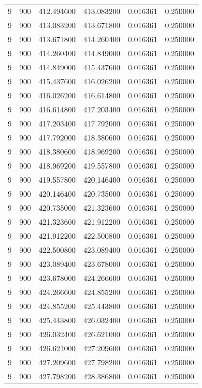 \begin{longtable}{rrrrrr}
9 & 900 & 412.494600 & 413.083200 & 0.016361 & 0.250000 \\
9 & 900 & 413.083200 & 413.671800 & 0.016361 & 0.250000 \\
9 & 900 & 413.671800 & 414.260400 & 0.016361 & 0.250000 \\
9 & 900 & 414.260400 & 414.849000 & 0.016361 & 0.250000 \\
9 & 900 & 414.849000 & 415.437600 & 0.016361 & 0.250000 \\
9 & 900 & 415.437600 & 416.026200 & 0.016361 & 0.250000 \\
9 & 900 & 416.026200 & 416.614800 & 0.016361 & 0.250000 \\
9 & 900 & 416.614800 & 417.203400 & 0.016361 & 0.250000 \\
9 & 900 & 417.203400 & 417.792000 & 0.016361 & 0.250000 \\
9 & 900 & 417.792000 & 418.380600 & 0.016361 & 0.250000 \\
9 & 900 & 418.380600 & 418.969200 & 0.016361 & 0.250000 \\
9 & 900 & 418.969200 & 419.557800 & 0.016361 & 0.250000 \\
9 & 900 & 419.557800 & 420.146400 & 0.016361 & 0.250000 \\
9 & 900 & 420.146400 & 420.735000 & 0.016361 & 0.250000 \\
9 & 900 & 420.735000 & 421.323600 & 0.016361 & 0.250000 \\
9 & 900 & 421.323600 & 421.912200 & 0.016361 & 0.250000 \\
9 & 900 & 421.912200 & 422.500800 & 0.016361 & 0.250000 \\
9 & 900 & 422.500800 & 423.089400 & 0.016361 & 0.250000 \\
9 & 900 & 423.089400 & 423.678000 & 0.016361 & 0.250000 \\
9 & 900 & 423.678000 & 424.266600 & 0.016361 & 0.250000 \\
9 & 900 & 424.266600 & 424.855200 & 0.016361 & 0.250000 \\
9 & 900 & 424.855200 & 425.443800 & 0.016361 & 0.250000 \\
9 & 900 & 425.443800 & 426.032400 & 0.016361 & 0.250000 \\
9 & 900 & 426.032400 & 426.621000 & 0.016361 & 0.250000 \\
9 & 900 & 426.621000 & 427.209600 & 0.016361 & 0.250000 \\
9 & 900 & 427.209600 & 427.798200 & 0.016361 & 0.250000 \\
9 & 900 & 427.798200 & 428.386800 & 0.016361 & 0.250000 \\

\end{longtable}
